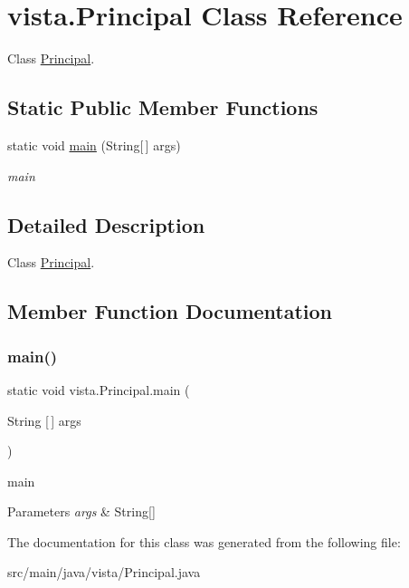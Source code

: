 \hypertarget{classvista_1_1_principal}{}\section{vista.\+Principal Class Reference}
\label{classvista_1_1_principal}


Class \mbox{\hyperlink{classvista_1_1_principal}{Principal}}.  


\subsection*{Static Public Member Functions}
\begin{DoxyCompactItemize}
\item 
static void \mbox{\hyperlink{classvista_1_1_principal_a1b8b2d94140680bad704c39bf9ee58cb}{main}} (String\mbox{[}$\,$\mbox{]} args)
\begin{DoxyCompactList}\small\item\em main \end{DoxyCompactList}\end{DoxyCompactItemize}


\subsection{Detailed Description}
Class \mbox{\hyperlink{classvista_1_1_principal}{Principal}}. 

\subsection{Member Function Documentation}
\mbox{\label{classvista_1_1_principal_a1b8b2d94140680bad704c39bf9ee58cb}} 
\subsubsection{\texorpdfstring{main()}{main()}}
{\footnotesize\ttfamily static void vista.\+Principal.\+main (\begin{DoxyParamCaption}\item[{String \mbox{[}$\,$\mbox{]}}]{args }\end{DoxyParamCaption})\hspace{0.3cm}{\ttfamily [static]}}



main 


\begin{DoxyParams}{Parameters}
{\em args} & String\mbox{[}\mbox{]} \\
\hline
\end{DoxyParams}


The documentation for this class was generated from the following file\+:\begin{DoxyCompactItemize}
\item 
src/main/java/vista/Principal.\+java\end{DoxyCompactItemize}
